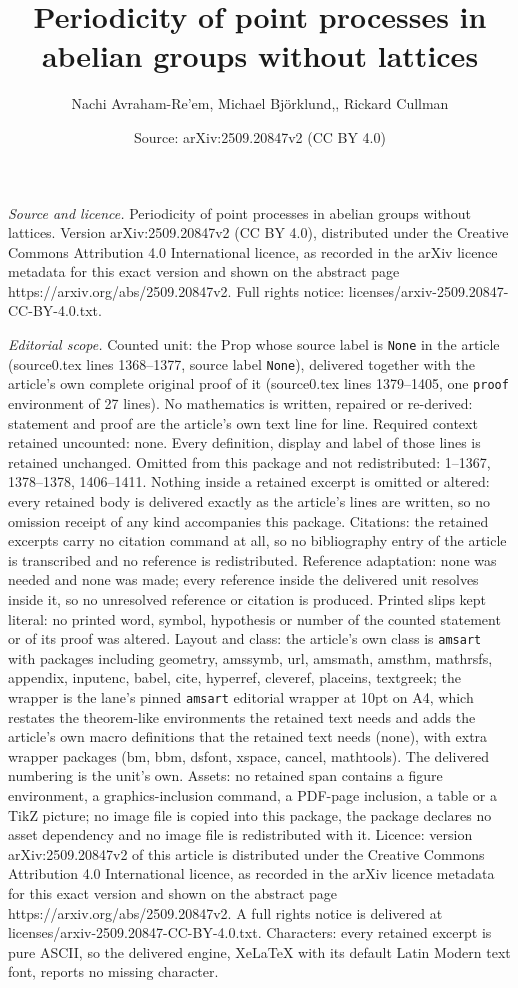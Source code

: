 \documentclass[10pt,a4paper]{amsart}
\title[Periodicity of point processes in abelian groups without lat]{Periodicity of point processes in abelian groups without lattices}
\author{Nachi Avraham-Re'em, Michael Bj\"orklund,, Rickard Cullman}
\date{Source: arXiv:2509.20847v2 (CC BY 4.0)}
\begin{document}
\maketitle

\noindent\emph{Source and licence.} Periodicity of point processes in abelian groups without lattices. Version arXiv:2509.20847v2 (CC BY 4.0), distributed under the Creative Commons Attribution 4.0 International licence, as recorded in the arXiv licence metadata for this exact version and shown on the abstract page https://arxiv.org/abs/2509.20847v2. Full rights notice: licenses/arxiv-2509.20847-CC-BY-4.0.txt.\par\smallskip

\noindent\textit{Editorial scope.} Counted unit: the Prop whose source label is \texttt{None} in the article (source0.tex lines 1368--1377, source label \texttt{None}), delivered together with the article's own complete original proof of it (source0.tex lines 1379--1405, one \texttt{proof} environment of 27 lines). No mathematics is written, repaired or re-derived: statement and proof are the article's own text line for line. Required context retained uncounted: none. Every definition, display and label of those lines is retained unchanged. Omitted from this package and not redistributed: 1--1367, 1378--1378, 1406--1411. Nothing inside a retained excerpt is omitted or altered: every retained body is delivered exactly as the article's lines are written, so no omission receipt of any kind accompanies this package. Citations: the retained excerpts carry no citation command at all, so no bibliography entry of the article is transcribed and no reference is redistributed. Reference adaptation: none was needed and none was made; every reference inside the delivered unit resolves inside it, so no unresolved reference or citation is produced. Printed slips kept literal: no printed word, symbol, hypothesis or number of the counted statement or of its proof was altered. Layout and class: the article's own class is \texttt{amsart} with packages including geometry, amssymb, url, amsmath, amsthm, mathrsfs, appendix, inputenc, babel, cite, hyperref, cleveref, placeins, textgreek; the wrapper is the lane's pinned \texttt{amsart} editorial wrapper at 10pt on A4, which restates the theorem-like environments the retained text needs and adds the article's own macro definitions that the retained text needs (none), with extra wrapper packages (bm, bbm, dsfont, xspace, cancel, mathtools). The delivered numbering is the unit's own. Assets: no retained span contains a figure environment, a graphics-inclusion command, a PDF-page inclusion, a table or a TikZ picture; no image file is copied into this package, the package declares no asset dependency and no image file is redistributed with it. Licence: version arXiv:2509.20847v2 of this article is distributed under the Creative Commons Attribution 4.0 International licence, as recorded in the arXiv licence metadata for this exact version and shown on the abstract page https://arxiv.org/abs/2509.20847v2. A full rights notice is delivered at licenses/arxiv-2509.20847-CC-BY-4.0.txt. Characters: every retained excerpt is pure ASCII, so the delivered engine, XeLaTeX with its default Latin Modern text font, reports no missing character.
\end{document}

